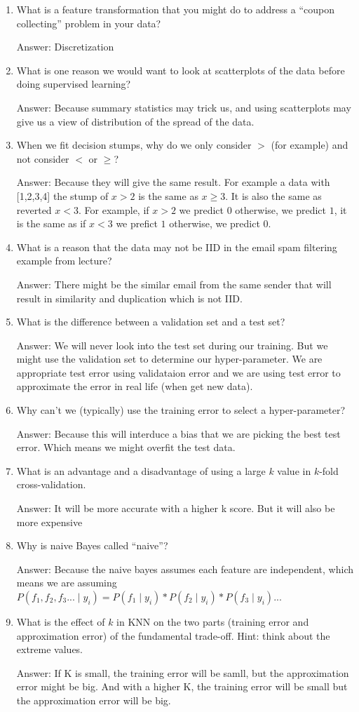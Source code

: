 \documentclass{article}
\def\ans#1{\par\gre{Answer: #1}}
\def\gre#1{{\color{gre}#1}}
\def\cond{\; | \;}
\def\enum#1{\begin{enumerate}#1\end{enumerate}}
\begin{document}
\enum{
 \item What is a feature transformation that you might do to address a ``coupon collecting'' problem in your data? \ans{Discretization}
\item What is one reason we would want to look at scatterplots of the data before doing supervised learning? \ans{Because summary statistics may trick us, and using scatterplots may give us a view of distribution of the spread of the data.}
 \item When we fit decision stumps, why do we only consider $>$ (for example) and not consider $<$ or $\geq$? \ans{Because they will give the same result. For example a data with [1,2,3,4] the stump of $x > 2$ is the same as $x \geq 3$. It is also the same as reverted $x < 3$. For example, if $x>2$ we predict $0$ otherwise, we predict $1$, it is the same as if $x<3$ we prefict $1$ otherwise, we predict $0$.}
\item What is a reason that the data may not be IID in the email spam filtering example from lecture? \ans{There might be the similar email from the same sender that will result in similarity and duplication which is not IID.}
\item What is the difference between a validation set and a test set? \ans{We will never look into the test set during our training. But we might use the validation set to determine our hyper-parameter. We are appropriate test error using validataion error and we are using test error to approximate the error in real life (when get new data).}
\item Why can't we (typically) use the training error to select a hyper-parameter? \ans{Because this will interduce a bias that we are picking the best test error. Which means we might overfit the test data. }
\item What is an advantage and a disadvantage of using a large $k$ value in $k$-fold cross-validation. \ans{It will be more accurate with a higher k score. But it will also be more expensive}
\item Why is  naive Bayes called ``naive''? \ans{Because the naive bayes assumes each feature are independent, which means we are assuming $P(f_1,f_2,f_3 ... \cond y_i) = P(f_1\cond y_i)*P(f_2\cond y_i)*P(f_3\cond y_i)...$}
\item What is the effect of $k$ in KNN on the two parts (training error and approximation error) of the fundamental trade-off. Hint: think about the extreme values. \ans{If K is small, the training error will be samll, but the approximation error might be big. And with a higher K, the training error will be small but the approximation error will be big.} 
}
\end{document}
